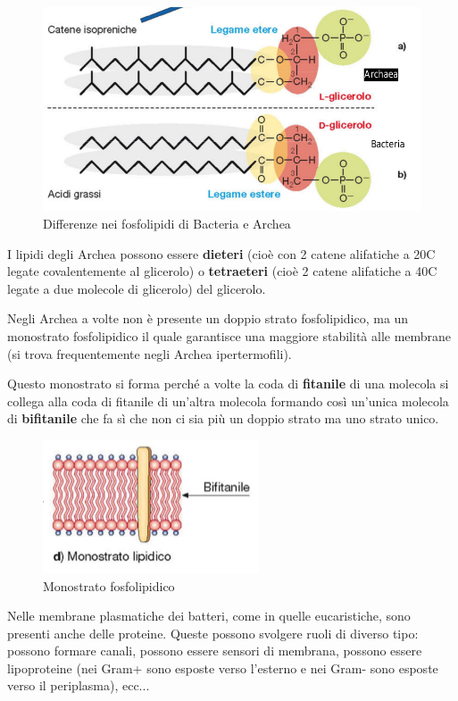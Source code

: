 \documentclass[11pt]{book}
\begin{document}
\begin{figure}[htp]
\centering
\includegraphics[scale=0.3]{img/Fosfolipidi.png}
\caption{Differenze nei fosfolipidi di Bacteria e Archea}
\label{}
\end{figure}

\vspace{1em}
I lipidi degli Archea possono essere \textbf{dieteri} (cioè con 2 catene alifatiche a 20C legate covalentemente al glicerolo) o \textbf{tetraeteri} (cioè 2 catene alifatiche a 40C legate a due molecole di glicerolo) del glicerolo. 

Negli Archea a volte non è presente un doppio strato fosfolipidico, ma un monostrato fosfolipidico il quale garantisce una maggiore stabilità alle membrane (si trova frequentemente negli Archea ipertermofili).

Questo monostrato si forma perché a volte la coda di \textbf{fitanile} di una molecola si collega alla coda di fitanile di un'altra molecola formando così un'unica molecola di \textbf{bifitanile} che fa sì che non ci sia più un doppio strato ma uno strato unico.

\begin{figure}[htp]
\centering
\includegraphics[scale=0.8]{img/Bifitanile.png}
\caption{Monostrato fosfolipidico}
\label{}
\end{figure}

Nelle membrane plasmatiche dei batteri, come in quelle eucaristiche, sono presenti anche delle proteine.
Queste possono svolgere ruoli di diverso tipo: possono formare canali, possono essere sensori di membrana, possono essere lipoproteine (nei Gram+ sono esposte verso l'esterno e nei Gram- sono esposte verso il periplasma), ecc...\\
\end{document}
